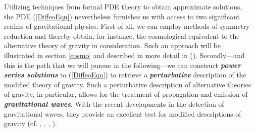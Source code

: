 \documentclass[%
preprint,
titlepage,
nofootinbib,
amsmath,amssymb,
showkeys,
aps,
prd,
floatfix,
]{revtex4-2}
\begin{document}
Utilizing techniques from formal PDE theory to obtain approximate solutions, the PDE (\ref{DiffeoEqn}) nevertheless furnishes us with access to two significant realms of gravitational physics. First of all, we can employ methods of symmetry reduction and thereby obtain, for instance, the cosmological equivalent to the alternative theory of gravity in consideration. Such an approach will be illustrated in section \ref{cosmo} and described in more detail in (\cite{NilsPHD}).
Secondly---and this is the path that we will pursue in the following---we can construct \textit{\textbf{power series solutions}} to (\ref{DiffeoEqn}) to retrieve a \textbf{\textit{perturbative}} description of the modified theory of gravity. Such a perturbative description of alternative theories of gravity, in particular, allows for the treatment of propagation and emission of \textit{\textbf{gravitational waves}}.
With the recent developments in the detection of gravitational waves, they provide an excellent test for modified descriptions of gravity (cf. \cite{2010PhRvD..81f4008Y}, \cite{2011PhRvD..83j4022B}, \cite{2017PhRvD..95j4027Z}, \cite{2013LRR....16....9Y} ).
\end{document}
